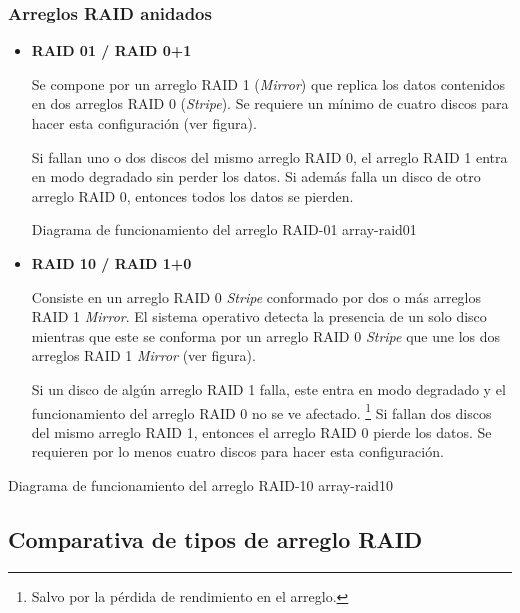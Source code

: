 \subsubsection*{Arreglos RAID anidados}

\begin{itemize}

  \item \textbf{RAID 01 / RAID 0+1}

Se compone por un arreglo \textsc{\gls{RAID}} 1 (\textit{Mirror}) que replica los datos contenidos en dos arreglos \textsc{\gls{RAID}} 0 (\textit{Stripe}). Se requiere un m\'{i}nimo de cuatro discos para hacer esta configuraci\'{o}n (ver figura).

Si fallan uno o dos discos del mismo arreglo \textsc{\gls{RAID}} 0, el arreglo \textsc{\gls{RAID}} 1 entra en modo degradado sin perder los datos. Si adem\'{a}s falla un disco de otro arreglo \textsc{\gls{RAID}} 0, entonces todos los datos se pierden.

\diagramblock
{Diagrama de funcionamiento del arreglo \textsc{RAID-01}}
{array-raid01}
{
 {
  
 }
}

\newpage
  \item \textbf{RAID 10 / RAID 1+0}

Consiste en un arreglo \textsc{\gls{RAID}} 0 \textit{Stripe} conformado por dos o m\'{a}s arreglos \textsc{\gls{RAID}} 1 \textit{Mirror}. El sistema operativo detecta la presencia de un solo disco mientras que este se conforma por un arreglo \textsc{\gls{RAID}} 0 \textit{Stripe} que une los dos arreglos \textsc{\gls{RAID}} 1 \textit{Mirror} (ver figura).

Si un disco de alg\'{u}n arreglo \textsc{\gls{RAID}} 1 falla, este entra en modo degradado y el funcionamiento del arreglo \textsc{\gls{RAID}} 0 no se ve afectado. \footnote{Salvo por la p\'{e}rdida de rendimiento en el arreglo.} Si fallan dos discos del mismo arreglo \textsc{\gls{RAID}} 1, entonces el arreglo \textsc{\gls{RAID}} 0 pierde los datos. Se requieren por lo menos cuatro discos para hacer esta configuraci\'{o}n.

\end{itemize}

\diagramblock
{Diagrama de funcionamiento del arreglo \textsc{RAID-10}}
{array-raid10}
{
 {
  
 }
}

\newpage
      \subsection {Comparativa de tipos de arreglo RAID}

